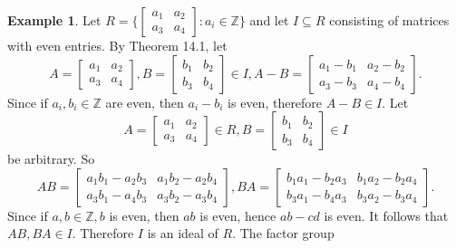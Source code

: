 \documentclass{article}
\theoremstyle{definition}
\newtheorem{example}{Example}[section]
\begin{document}
\begin{example}
    Let $R=\bigg\{\begin{bmatrix}a_1 & a_2 \\ a_3 & a_4\end{bmatrix}: a_i \in \mathbb{Z}\bigg\}$ and let $I\subseteq R$ consisting of matrices with even entries. By Theorem 14.1, let
    \begin{equation*}
        A=\begin{bmatrix}
           a_1 & a_2 \\
           a_3 & a_4
        \end{bmatrix},
        B=\begin{bmatrix}
           b_1 & b_2 \\
           b_3 & b_4
        \end{bmatrix}
        \in I, A-B = \begin{bmatrix}
           a_1-b_1 & a_2-b_2 \\
           a_3-b_3 & a_4-b_4
        \end{bmatrix}.
    \end{equation*}
    Since if $a_i,b_i\in \mathbb{Z}$ are even, then $a_i-b_i$ is even, therefore $A-B\in I$. Let 
    \begin{equation*}
        A=\begin{bmatrix}
           a_1 & a_2 \\
           a_3 & a_4
        \end{bmatrix}\in R,
        B=\begin{bmatrix}
           b_1 & b_2 \\
           b_3 & b_4
        \end{bmatrix}
        \in I
    \end{equation*}
    be arbitrary. So
    \begin{equation*}
        AB=\begin{bmatrix}
           a_1b_1-a_2b_3 & a_1b_2-a_2b_4 \\
           a_3b_1-a_4b_3 & a_3b_2-a_3b_4
        \end{bmatrix},
        BA=\begin{bmatrix}
           b_1a_1-b_2a_3 & b_1a_2-b_2a_4 \\
           b_3a_1-b_4a_3 & b_3a_2-b_3a_4
        \end{bmatrix}.
    \end{equation*}
    Since if $a,b \in \mathbb{Z}, b$ is even, then $ab$ is even, hence $ab-cd$ is even. It follows that $AB,BA \in I$. Therefore $I$ is an ideal of $R$. The factor group 

\end{example}
\end{document}
